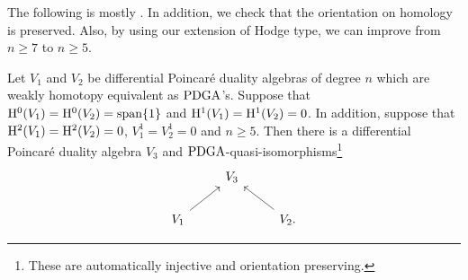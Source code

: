 \documentclass[\MainFolder/Text.tex]{subfiles}
\begin{document}
The following is mostly \cite[Theorem~7.1]{Lambrechts2007}.
In addition, we check that the orientation on homology is preserved.
Also, by using our extension of Hodge type, we can improve from $n\ge 7$ to $n\ge 5$.

\begin{Proposition}\label{Prop:LambrechtUnique}
Let $V_1$ and $V_2$ be differential Poincar\'e duality algebras of degree $n$ which are weakly homotopy equivalent as $\mathrm{PDGA}$'s.
Suppose that $\mathrm{H}^0(V_1)=\mathrm{H}^0(V_2)=\mathrm{span}\{1\}$ and $\mathrm{H}^1(V_1) = \mathrm{H}^1(V_2) = 0$.
In addition, suppose that $\mathrm{H}^2(V_1) = \mathrm{H}^2(V_2) = 0$, $V_1^1 = V_2^1 = 0$ and $n\ge 5$.
Then there is a differential Poincar\'e duality algebra $V_3$ and $\mathrm{PDGA}$-quasi-isomorphisms\footnote{These are automatically injective and orientation preserving.}
\begin{equation}\label{Eq:LambrechtsZigZag}
\begin{tikzcd}
& V_3 & \\
V_1\arrow{ur}& & \arrow{ul}V_2.
\end{tikzcd}
\end{equation}
\end{Proposition}
\end{document}
